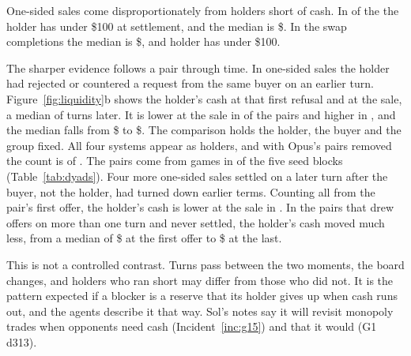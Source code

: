 One-sided sales come disproportionately from holders short of cash. In  of the  the holder has under \$100 at settlement, and the median is \$. In the  swap completions the median is \$, and  holder has under \$100.

The sharper evidence follows a pair through time. In  one-sided sales the holder had rejected or countered a request from the same buyer on an earlier turn. Figure~\ref{fig:liquidity}b shows the holder's cash at that first refusal and at the sale, a median of  turns later. It is lower at the sale in  of the  pairs and higher in , and the median falls from \$ to \$. The comparison holds the holder, the buyer and the group fixed. All four systems appear as holders, and with Opus's  pairs removed the count is  of . The pairs come from  games in  of the five seed blocks (Table~\ref{tab:dyads}). Four more one-sided sales settled on a later turn after the buyer, not the holder, had turned down earlier terms. Counting all  from the pair's first offer, the holder's cash is lower at the sale in . In the  pairs that drew offers on more than one turn and never settled, the holder's cash moved much less, from a median of \$ at the first offer to \$ at the last.

This is not a controlled contrast. Turns pass between the two moments, the board changes, and holders who ran short may differ from those who did not. It is the pattern expected if a blocker is a reserve that its holder gives up when cash runs out, and the agents describe it that way. Sol's notes say it will revisit monopoly trades when opponents need cash (Incident~\ref{inc:g15}) and that it would  (G1 d313).

